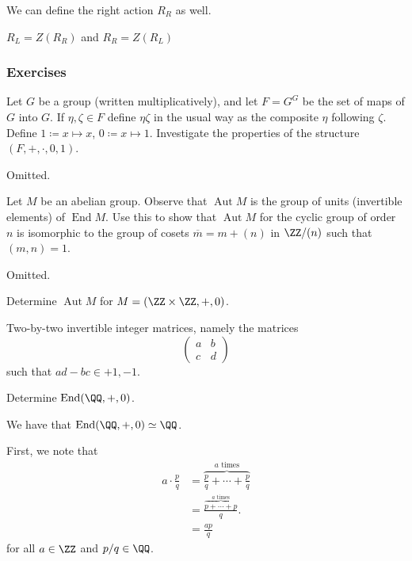 \documentclass{article}
\newcommand*\isom{\ensuremath{\simeq}}
\newcommand*\Aut{\ensuremath{\operatorname{Aut}}}
\newcommand*\End{\ensuremath{\operatorname{End}}}
\begin{document}
We can define the right action $R_R$ as well.
\begin{theorem}
    $R_L = Z(R_R)$ and $R_R = Z(R_L)$
\end{theorem}

\subsubsection*{Exercises}

\begin{exercise}
    Let $G$ be a group (written multiplicatively), and let $F = G^G$ be the set of maps of $G$ into $G$.
    If $\eta, \zeta \in F$ define $\eta\zeta$ in the usual way as the composite $\eta$ following $\zeta$.
    Define $1 \coloneq x \mapsto x$, $0 \coloneq x \mapsto 1$.
    Investigate the properties of the structure $(F,+,\cdot,0,1)$.
\end{exercise}

Omitted.

\begin{exercise}
    Let $M$ be an abelian group.
    Observe that $\Aut M$ is the group of units (invertible elements) of $\End M$.
    Use this to show that $\Aut M$ for the cyclic group of order $n$ is isomorphic to the group of cosets $\overline{m} = m + (n)$ in $\ZZ/(n)$ such that $(m,n) = 1$.
\end{exercise}

Omitted.

\begin{exercise}
    Determine $\Aut M$ for $M = (\ZZ \times \ZZ, +, 0)$.
\end{exercise}

Two-by-two invertible integer matrices, namely the matrices
\[
    \begin{pmatrix}
        a & b \\
        c & d
    \end{pmatrix}
\]
such that $ad - bc \in {+1,-1}$.

\begin{exercise}
    Determine $\End (\QQ,+,0)$.
\end{exercise}

We have that $\End (\QQ,+,0) \isom \QQ$.

First, we note that 
\begin{align*}
    a \cdot \frac{p}{q}
    &=
    \overbrace{
        \frac{p}{q} + \cdots + \frac{p}{q}
    }^{a \text{ times}}
    \\
    &=
    \frac{
        \overbrace{
            p + \cdots + p
        }^{a \text{ times}}
    }{q}.
    \\
    &=
    \frac{ap}{q}
\end{align*}
for all $a \in \ZZ$ and $p/q \in \QQ$.
\end{document}

